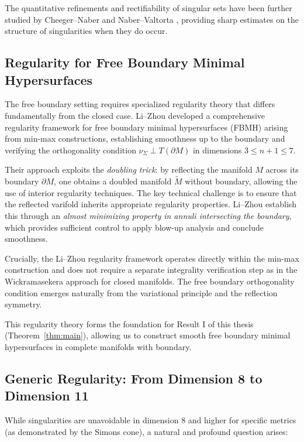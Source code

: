 The quantitative refinements and rectifiability of singular sets have been further studied by
Cheeger--Naber \cite{CN13} and Naber--Valtorta \cite{NV20}, providing sharp estimates on the
structure of singularities when they do occur.

\subsection{Regularity for Free Boundary Minimal Hypersurfaces}\label{subsec:lizhou-regularity}

The free boundary setting requires specialized regularity theory that differs fundamentally from
the closed case. Li--Zhou \cite{LZ17} developed a comprehensive regularity framework for free
boundary minimal hypersurfaces (FBMH) arising from min-max constructions, establishing smoothness
up to the boundary and verifying the orthogonality condition $\nu_\Sigma \perp T(\partial M)$ in
dimensions $3 \leq n+1 \leq 7$.

Their approach exploits the \emph{doubling trick}: by reflecting the manifold $M$ across its
boundary $\partial M$, one obtains a doubled manifold $\tilde{M}$ without boundary, allowing the
use of interior regularity techniques. The key technical challenge is to ensure that the reflected
varifold inherits appropriate regularity properties. Li--Zhou establish this through an
\emph{almost minimizing property in annuli intersecting the boundary}, which provides sufficient
control to apply blow-up analysis and conclude smoothness.

Crucially, the Li--Zhou regularity framework operates directly within the min-max construction and
does not require a separate integrality verification step as in the Wickramasekera approach for
closed manifolds. The free boundary orthogonality condition emerges naturally from the variational
principle and the reflection symmetry.

This regularity theory forms the foundation for Result I of this thesis (Theorem~\ref{thm:main}),
allowing us to construct smooth free boundary minimal hypersurfaces in complete manifolds with
boundary.

\subsection{Generic Regularity: From Dimension 8 to Dimension 11}\label{subsec:generic-regularity-dim8}

While singularities are unavoidable in dimension $8$ and higher for specific metrics (as
demonstrated by the Simons cone), a natural and profound question arises:

